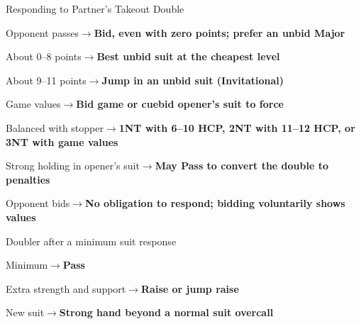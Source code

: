 \documentclass[10pt,letterpaper]{article}
\begin{document}
\begin{minipage}[t]{0.485\textwidth}
\begin{guidecard}{Responding to Partner's Takeout Double}
\begin{branches}
\item Opponent passes\;\ensuremath{\longrightarrow}\;\textbf{Bid, even with zero points; prefer an unbid Major}
\begin{branches}
\item About 0--8 points\;\ensuremath{\longrightarrow}\;\textbf{Best unbid suit at the cheapest level}
\item About 9--11 points\;\ensuremath{\longrightarrow}\;\textbf{Jump in an unbid suit (Invitational)}
\item Game values\;\ensuremath{\longrightarrow}\;\textbf{Bid game or cuebid opener's suit to force}
\item Balanced with stopper\;\ensuremath{\longrightarrow}\;\textbf{1NT with 6--10 HCP, 2NT with 11--12 HCP, or 3NT with game values}
\item Strong holding in opener's suit\;\ensuremath{\longrightarrow}\;\textbf{May Pass to convert the double to penalties}
\end{branches}
\item Opponent bids\;\ensuremath{\longrightarrow}\;\textbf{No obligation to respond; bidding voluntarily shows values}
\item Doubler after a minimum suit response
\begin{branches}
\item Minimum\;\ensuremath{\longrightarrow}\;\textbf{Pass}
\item Extra strength and support\;\ensuremath{\longrightarrow}\;\textbf{Raise or jump raise}
\item New suit\;\ensuremath{\longrightarrow}\;\textbf{Strong hand beyond a normal suit overcall}
\end{branches}
\end{branches}
\end{guidecard}

\end{minipage}\hfill
\end{document}
